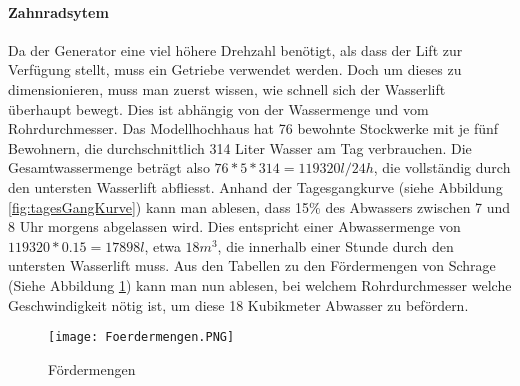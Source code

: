 \paragraph{Zahnradsytem}
Da der Generator eine viel höhere Drehzahl benötigt, als dass der Lift zur Verfügung stellt, muss ein Getriebe verwendet werden. Doch um dieses zu dimensionieren, muss man zuerst wissen, wie schnell sich der Wasserlift überhaupt bewegt. Dies ist abhängig von der Wassermenge und vom Rohrdurchmesser. Das Modellhochhaus hat 76 bewohnte Stockwerke mit je fünf Bewohnern, die durchschnittlich 314 Liter Wasser am Tag verbrauchen. Die Gesamtwassermenge beträgt also \(76 * 5 * 314 = 119320 l/24h\), die vollständig durch den untersten Wasserlift abfliesst. Anhand der Tagesgangkurve (siehe Abbildung \ref{fig:tagesGangKurve}) kann man ablesen, dass 15\% des Abwassers zwischen 7 und 8 Uhr morgens abgelassen wird. Dies entspricht einer Abwassermenge von \(119320 * 0.15 = 17898 l\), etwa \(18 m^3 \), die innerhalb einer Stunde durch den untersten Wasserlift muss. Aus den Tabellen zu den Fördermengen von Schrage (Siehe Abbildung \ref{fig:foerdermengen}) kann man nun ablesen, bei welchem Rohrdurchmesser welche Geschwindigkeit nötig ist, um diese 18 Kubikmeter Abwasser zu befördern. 

\begin{figure} [H]
	\centering
	\texttt{[image: Foerdermengen.PNG]}
	\caption{Fördermengen \cite{schrage}}
	\label{fig:foerdermengen}
\end{figure}

